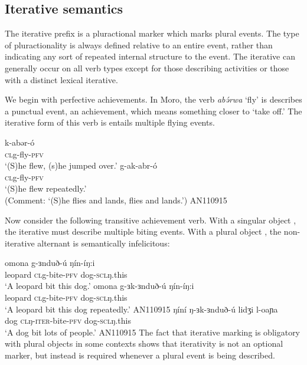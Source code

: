 \subsection{Iterative semantics}\label{sec:ch11:iterativesem}

The iterative prefix is a pluractional marker which marks plural events. The type of pluractionality is always defined relative to an entire event, rather than indicating any sort of repeated internal structure to the event. The iterative can generally occur on all verb types except for those describing activities or those with a distinct lexical iterative.

We begin with perfective achievements. In Moro, the verb \textit{abə́rwa} `fly' is describes a punctual event, an achievement, which means something closer to `take off.' The iterative form of this verb is entails multiple flying events.

\ea 
\ea  \gll  k-abər-ó		 	\\
	  \textsc{cl}g-fly-\textsc{pfv} \\ 
\glt  ‘(S)he flew, (s)he jumped over.'		
\ex 
\gll  g-ak-abr-ó 		 	\\
	  \textsc{cl}g-fly-\textsc{pfv} \\ 
\glt  ‘(S)he flew repeatedly.'\\ (Comment: ‘(S)he flies and lands, flies and lands.’)	\hfill AN110915
\z 
\z 

Now consider the following transitive achievement verb. With a singular object , the iterative must describe multiple biting events. With a plural object , the non-iterative alternant is semantically infelicitous:

\ea \label{ex:ch11:itersgo}
\ea 
\gll  omona 	g-ɜnduð-ú	ŋín-íŋ:i\\
	  leopard \textsc{cl}g-bite-\textsc{pfv} dog-\textsc{scl}ŋ.this\\
\glt `A leopard bit this dog.'	
\ex 
\gll  omona 	g-ɜk-ɜnduð-ú	ŋín-íŋ:i\\
	  leopard \textsc{cl}g-bite-\textsc{pfv} dog-\textsc{scl}ŋ.this\\
\glt `A leopard bit this dog repeatedly.'	 \hfill AN110915
\z 
\ex \label{ex:ch11:iterplo}
\ex 
\gll  ŋíní 	ŋ-ɜk-ɜnduð-ú	lidʒi l-oaɲa\\
	  dog \textsc{cl}ŋ-\textsc{iter}-bite-\textsc{pfv} dog-\textsc{scl}ŋ.this\\
\glt `A dog bit lots of people.' \hfill AN110915
\z 
\z 
The fact that iterative marking is obligatory with plural objects in some contexts shows that iterativity is not an optional marker, but instead is required whenever a plural event is being described.

